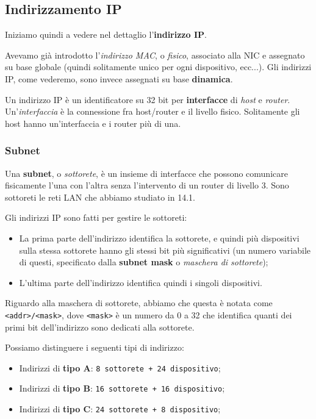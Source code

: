 \documentclass[a4paper,11pt]{article}
\begin{document}
\subsection{Indirizzamento IP}
Iniziamo quindi a vedere nel dettaglio l'\textbf{indirizzo IP}.

Avevamo già introdotto l'\textit{indirizzo MAC}, o \textit{fisico}, associato alla NIC e assegnato su base globale (quindi solitamente unico per ogni dispositivo, ecc...).
Gli indirizzi IP, come vederemo, sono invece assegnati su base \textbf{dinamica}.

Un indirizzo IP è un identificatore su 32 bit per \textbf{interfacce} di \textit{host} e \textit{router}.
Un'\textit{interfaccia} è la connessione fra host/router e il livello fisico.
Solitamente gli host hanno un'interfaccia e i router più di una.

\subsubsection{Subnet}
Una \textbf{subnet}, o \textit{sottorete}, è un insieme di interfacce che possono comunicare fisicamente l'una con l'altra senza l'intervento di un router di livello 3.
Sono sottoreti le reti LAN che abbiamo studiato in 14.1.

Gli indirizzi IP sono fatti per gestire le sottoreti:
\begin{itemize}
	\item La prima parte dell'indirizzo identifica la sottorete, e quindi più dispositivi sulla stessa sottorete hanno gli stessi bit più significativi (un numero variabile di questi, specificato dalla \textbf{subnet mask} o \textit{maschera di sottorete});
	\item L'ultima parte dell'indirizzo identifica quindi i singoli dispositivi.
\end{itemize}

Riguardo alla maschera di sottorete, abbiamo che questa è notata come \lstinline|<addr>/<mask>|, dove \lstinline|<mask>| è un numero da 0 a 32 che identifica quanti dei primi bit dell'indirizzo sono dedicati alla sottorete.

Possiamo distinguere i seguenti tipi di indirizzo:
\begin{itemize}
	\item Indirizzi di \textbf{tipo A}: \lstinline|8 sottorete + 24 dispositivo|;
	\item Indirizzi di \textbf{tipo B}: \lstinline|16 sottorete + 16 dispositivo|;
	\item Indirizzi di \textbf{tipo C}: \lstinline|24 sottorete + 8 dispositivo|;
\end{itemize}
\end{document}

